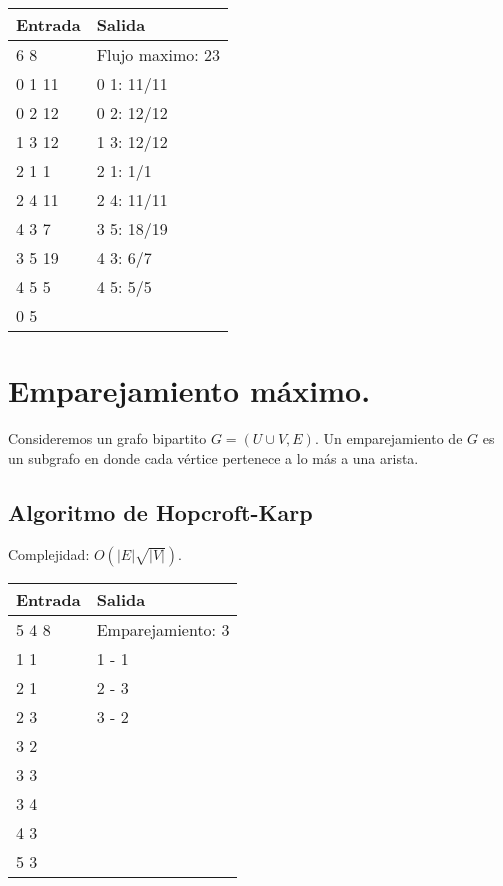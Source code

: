 \documentclass[12pt, letterpaper, twoside]{article}
\begin{document}
\begin{tabular}{|p{7cm}|p{7cm}|}
\hline
\textbf{Entrada} & \textbf{Salida}\\ \hline
6 8 & Flujo maximo: 23\\
0 1 11 & 0 1: 11/11\\
0 2 12 & 0 2: 12/12\\
1 3 12 & 1 3: 12/12\\
2 1 1  & 2 1: 1/1\\
2 4 11 & 2 4: 11/11\\
4 3 7  & 3 5: 18/19\\
3 5 19 & 4 3: 6/7\\
4 5 5 & 4 5: 5/5\\ 
0 5 & \\ \hline
\end{tabular}

\newpage

\section{Emparejamiento máximo.}

Consideremos un grafo bipartito $G = (U \cup V, E)$. Un emparejamiento de $G$ es un subgrafo en donde cada vértice pertenece a lo más a una arista.


\subsection{Algoritmo de Hopcroft-Karp}

Complejidad: $O(|E|\sqrt{|V|})$.

 \medskip

\begin{tabular}{|p{7cm}|p{7cm}|}
\hline
\textbf{Entrada} & \textbf{Salida}\\ \hline
5 4 8 & Emparejamiento: 3\\
1 1   & 1 - 1\\
2 1   & 2 - 3\\
2 3   & 3 - 2\\
3 2   & \\
3 3   & \\
3 4   & \\
4 3   & \\
5 3   & \\ \hline
\end{tabular}
\end{document}
